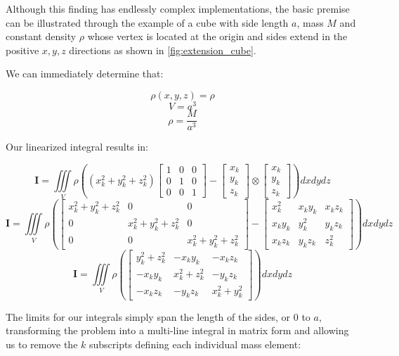 Although this finding has endlessly complex implementations, the basic premise can be illustrated through the example of a cube with side length $a$, mass $M$ and constant density $\rho$ whose vertex is located at the origin and sides extend in the positive $x, y, z$ directions as shown in \cref{fig:extension_cube}.



We can immediately determine that:

\[\rho(x,y,z) = \rho\]
\[V = a^3\]
\[\rho = \frac{M}{a^3}\]

Our linearized integral results in:

\[\bm{I} = \iiint\limits_{V} \rho\left((x_k^2 + y_k^2 + z_k^2)\begin{bmatrix}1 & 0 & 0 \\ 0 & 1 & 0 \\ 0 & 0 & 1\end{bmatrix} - \begin{bmatrix}x_k \\ y_k \\ z_k\end{bmatrix} \otimes \begin{bmatrix}x_k \\ y_k \\ z_k\end{bmatrix}\right)dxdydz\]
\[\bm{I} = \iiint\limits_{V} \rho\left(\begin{bmatrix}x_k^2 + y_k^2 + z_k^2 & 0 & 0 \\ 0 & x_k^2 + y_k^2 + z_k^2 & 0 \\ 0 & 0 & x_k^2 + y_k^2 + z_k^2\end{bmatrix} - \begin{bmatrix}x_k^2 & x_ky_k & x_kz_k \\ x_ky_k & y_k^2 & y_kz_k \\ x_kz_k & y_kz_k & z_k^2 \end{bmatrix}\right)dxdydz\]
\[\bm{I} = \iiint\limits_{V} \rho\left(\begin{bmatrix}y_k^2 + z_k^2 & -x_ky_k & -x_kz_k \\ -x_ky_k & x_k^2 + z_k^2 & -y_kz_k \\ -x_kz_k & -y_kz_k & x_k^2 + y_k^2 \end{bmatrix}\right)dxdydz\]

The limits for our integrals simply span the length of the sides, or $0$ to $a$, transforming the problem into a multi-line integral in matrix form and allowing us to remove the $k$ subscripts defining each individual mass element:

